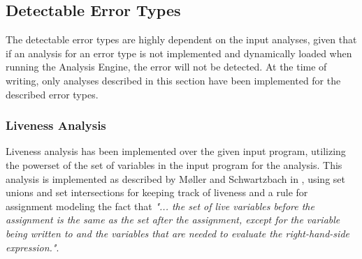 \subsection{Detectable Error Types}

The detectable error types are highly dependent on the input analyses, given that if an analysis for an error type is not implemented and dynamically loaded when running the Analysis Engine, the error will not be detected. At the time of writing, only analyses described in this section have been implemented for the described error types. 

\subsubsection{Liveness Analysis}
Liveness analysis has been implemented over the given input program, utilizing the powerset of the set of variables in the input program for the analysis. 
This analysis is implemented as described by Møller and Schwartzbach in \cite{spa}, using set unions and set intersections for keeping track of liveness and a rule for assignment modeling the fact that \textit{"... the set of live variables before the assignment is the same as the set after the assignment, except for the variable being written to and the variables that are needed to evaluate the right-hand-side expression."}. 

